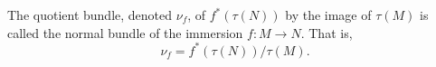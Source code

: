 The quotient bundle, denoted $\nu_f$, of $f^*(\tau(N))$ by the image of $\tau(M)$ is called the normal bundle of the immersion $f: M \to N$. That is,
$$\nu_f = f^*(\tau(N)) / \tau(M).$$
